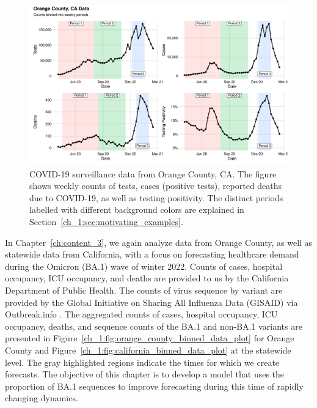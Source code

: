 \begin{figure}
    \centering
    \includegraphics[width=1.0\columnwidth]{binned_data_plot}
    \caption[COVID-19 surveillance data from Orange County, CA.]{
    COVID-19 surveillance data from Orange County, CA.
    The figure shows weekly counts of tests, cases (positive tests), reported deaths due to COVID-19, as well as testing positivity.
    The distinct periods labelled with different background colors are explained in Section~\ref{ch_1:sec:motivating_examples}.}
    \label{ch_1:fig:binned_data_plot}
\end{figure}

In Chapter~\ref{ch:content_3}, we again analyze data from Orange County, as well as statewide data from California, with a focus on forecasting healthcare demand during the Omicron (BA.1) wave of winter 2022. 
Counts of cases, hospital occupancy, ICU occupancy, and deaths are provided to us by the California Department of Public Health.
The counts of virus sequence by variant are provided by the Global Initiative on Sharing All Influenza Data (GISAID) \citep{shu2017gisaid} via Outbreak.info \citep{Gangavarapu2023}.
The aggregated counts of cases, hospital occupancy, ICU occupancy, deaths, and sequence counts of the BA.1 and non-BA.1 variants are presented in Figure~\ref{ch_1:fig:orange_county_binned_data_plot} for Orange County and Figure~\ref{ch_1:fig:california_binned_data_plot} at the statewide level.
The gray highlighted regions indicate the times for which we create forecasts.
The objective of this chapter is to develop a model that uses the proportion of BA.1 sequences to improve forecasting during this time of rapidly changing dynamics.

